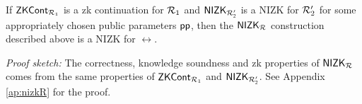  
\begin{theorem}
	If ${\mathsf{ZKCont}}_{\mathcal{R}_1}$ is a zk continuation for $\mathcal{R}_1$ and ${\mathsf{NIZK_{\mathcal{R}'_2}}}$ is a NIZK for $\mathcal{R}_2'$ for some appropriately chosen public parameters $\mathsf{pp}$, 
	then the ${\mathsf{NIZK_{\mathcal{R}}}}$ construction described above is a NIZK for $\rel$.
\end{theorem}

\textit{Proof sketch:} The correctness, knowledge soundness and zk properties of $ {\mathsf{NIZK_{\mathcal{R}}}} $ comes from the same properties of $ {\mathsf{ZKCont}}_{\mathcal{R}_1} $ and $ {\mathsf{NIZK_{\mathcal{R}'_2}}} $. See Appendix \ref{ap:nizkR} for the proof.
